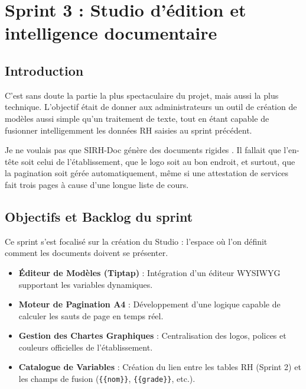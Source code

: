 
\chapter{Sprint 3 : Studio d'édition et intelligence documentaire}

\section{Introduction}

C'est sans doute la partie la plus \og spectaculaire \fg{} du projet, mais aussi la plus technique. L'objectif était de donner aux administrateurs un outil de création de modèles aussi simple qu'un traitement de texte, tout en étant capable de fusionner intelligemment les données RH saisies au sprint précédent. 

Je ne voulais pas que SIRH-Doc génère des documents \og rigides \fg{}. Il fallait que l'en-tête soit celui de l'établissement, que le logo soit au bon endroit, et surtout, que la pagination soit gérée automatiquement, même si une attestation de services fait trois pages à cause d'une longue liste de cours.

\section{Objectifs et Backlog du sprint}

Ce sprint s'est focalisé sur la création du \og Studio \fg{} : l'espace où l'on définit comment les documents doivent se présenter.

\begin{itemize}
    \item \textbf{Éditeur de Modèles (Tiptap)} : Intégration d'un éditeur WYSIWYG supportant les variables dynamiques.
    \item \textbf{Moteur de Pagination A4} : Développement d'une logique capable de calculer les sauts de page en temps réel.
    \item \textbf{Gestion des Chartes Graphiques} : Centralisation des logos, polices et couleurs officielles de l'établissement.
    \item \textbf{Catalogue de Variables} : Création du lien entre les tables RH (Sprint 2) et les champs de fusion (\texttt{\{\{nom\}\}}, \texttt{\{\{grade\}\}}, etc.).
\end{itemize}

